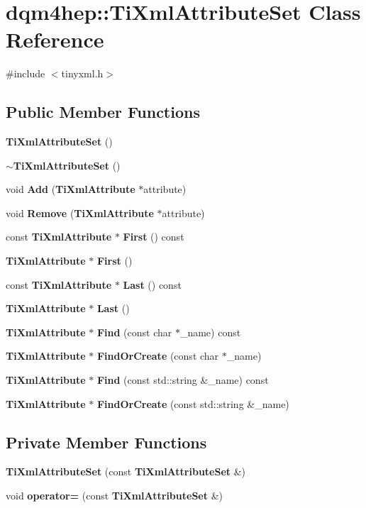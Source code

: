\section{dqm4hep\+:\+:Ti\+Xml\+Attribute\+Set Class Reference}
\label{classdqm4hep_1_1TiXmlAttributeSet}


{\ttfamily \#include $<$tinyxml.\+h$>$}

\subsection*{Public Member Functions}
\begin{DoxyCompactItemize}
\item 
{\bf Ti\+Xml\+Attribute\+Set} ()
\item 
{\bf $\sim$\+Ti\+Xml\+Attribute\+Set} ()
\item 
void {\bf Add} ({\bf Ti\+Xml\+Attribute} $\ast$attribute)
\item 
void {\bf Remove} ({\bf Ti\+Xml\+Attribute} $\ast$attribute)
\item 
const {\bf Ti\+Xml\+Attribute} $\ast$ {\bf First} () const 
\item 
{\bf Ti\+Xml\+Attribute} $\ast$ {\bf First} ()
\item 
const {\bf Ti\+Xml\+Attribute} $\ast$ {\bf Last} () const 
\item 
{\bf Ti\+Xml\+Attribute} $\ast$ {\bf Last} ()
\item 
{\bf Ti\+Xml\+Attribute} $\ast$ {\bf Find} (const char $\ast$\+\_\+name) const 
\item 
{\bf Ti\+Xml\+Attribute} $\ast$ {\bf Find\+Or\+Create} (const char $\ast$\+\_\+name)
\item 
{\bf Ti\+Xml\+Attribute} $\ast$ {\bf Find} (const std\+::string \&\+\_\+name) const 
\item 
{\bf Ti\+Xml\+Attribute} $\ast$ {\bf Find\+Or\+Create} (const std\+::string \&\+\_\+name)
\end{DoxyCompactItemize}
\subsection*{Private Member Functions}
\begin{DoxyCompactItemize}
\item 
{\bf Ti\+Xml\+Attribute\+Set} (const {\bf Ti\+Xml\+Attribute\+Set} \&)
\item 
void {\bf operator=} (const {\bf Ti\+Xml\+Attribute\+Set} \&)
\end{DoxyCompactItemize}
